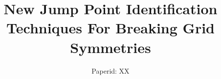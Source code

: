 \documentclass{ecai2012/ecai2012}
\begin{document}
\title{New Jump Point Identification Techniques For Breaking Grid Symmetries}
\author{Paperid: XX}

\maketitle










%



\end{document}
